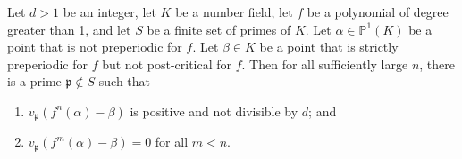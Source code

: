 \documentclass[10pt,a4paper]{amsart}
\newcommand{\bP}{\ensuremath{{\mathbb{P}}}}
\newcommand{\fp}{\ensuremath{{\mathfrak{p}}}}
\begin{document}
\begin{prop}\label{main-d}
  Let $d > 1$ be an integer, let $K$ be a number field, let
  $f$ be a polynomial of degree greater than 1, and let
  $S$ be a finite set of primes of $K$.  Let
  $\alpha \in \bP^1(K)$ be a point that is not preperiodic for
  $f$.  Let $\beta \in K$ be a point that is strictly preperiodic for
  $f$ but not post-critical for $f$.  Then for all
  sufficiently large $n$, there is a prime $\fp \notin S$ such that
  \begin{enumerate}
    \item[(1)] $v_\fp(f^n(\alpha) - \beta)$ is positive and not
      divisible by $d$; and
      \item[(2)] $v_\fp(f^m(\alpha) - \beta) = 0$ for all $m < n$.
  \end{enumerate}
  
\end{prop}
\end{document}
